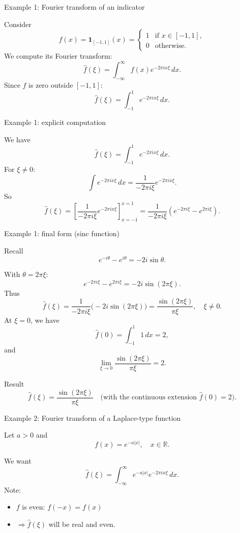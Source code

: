 \documentclass[aspectratio=169]{beamer}
\begin{document}
\begin{frame}{Example 1: Fourier transform of an indicator}

Consider
\[
f(x)=\mathbf{1}_{[-1,1]}(x)=
\begin{cases}
1 & \text{if } x\in[-1,1],\\
0 & \text{otherwise.}
\end{cases}
\]
\pause
We compute its Fourier transform:
\[
\hat f(\xi)=\int_{-\infty}^{\infty}
f(x)e^{-2\pi i x\xi}\,dx.
\]
\pause
Since $f$ is zero outside $[-1,1]$:
\[
\hat f(\xi)=\int_{-1}^{1}
e^{-2\pi i x\xi}\,dx.
\]

\end{frame}

\begin{frame}{Example 1: explicit computation}

We have
\[
\hat f(\xi)=\int_{-1}^{1}
e^{-2\pi i x\xi}\,dx.
\]
\pause
For $\xi\neq 0$:
\[
\int e^{-2\pi i x\xi}\,dx
=
\frac{1}{-2\pi i\xi}e^{-2\pi i x\xi}.
\]
\pause
So
\[
\hat f(\xi)
=
\left[
\frac{1}{-2\pi i\xi}e^{-2\pi i x\xi}
\right]_{x=-1}^{x=1}
=
\frac{1}{-2\pi i\xi}
\left(
e^{-2\pi i \xi}-e^{2\pi i \xi}
\right).
\]

\end{frame}

\begin{frame}{Example 1: final form (sinc function)}

Recall
\[
e^{-i\theta}-e^{i\theta} = -2i\sin\theta.
\]

With $\theta=2\pi\xi$:
\[
e^{-2\pi i \xi}-e^{2\pi i \xi}
= -2i\sin(2\pi\xi).
\]
\pause
Thus
\[
\hat f(\xi)
=
\frac{1}{-2\pi i\xi}\big(-2i\sin(2\pi\xi)\big)
=
\frac{\sin(2\pi\xi)}{\pi\xi},
\quad \xi\neq 0.
\]
\pause
At $\xi=0$, we have
\[
\hat f(0)=\int_{-1}^{1}1\,dx=2,
\]
and
\[
\lim_{\xi\to 0}\frac{\sin(2\pi\xi)}{\pi\xi}=2.
\]

\begin{block}{Result}
\[
\boxed{\hat f(\xi)=\frac{\sin(2\pi\xi)}{\pi\xi}}
\quad \text{(with the continuous extension } \hat f(0)=2\text{).}
\]
\end{block}

\end{frame}

\begin{frame}{Example 2: Fourier transform of a Laplace-type function}

Let $a>0$ and
\[
f(x)=e^{-a|x|},\quad x\in\mathbb{R}.
\]

We want
\[
\hat f(\xi)=\int_{-\infty}^{\infty}
e^{-a|x|}e^{-2\pi i x\xi}\,dx.
\]
\pause
Note:
\begin{itemize}
    \item $f$ is even: $f(-x)=f(x)$
    \item $\Rightarrow \hat f(\xi)$ will be real and even.
\end{itemize}

\end{frame}
\end{document}
